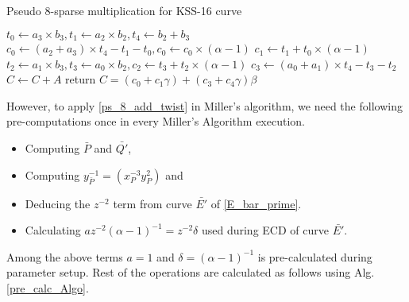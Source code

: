 \vspace{0.6em}
\begin{algorithm}[H]
	\caption{Pseudo 8-sparse multiplication for KSS-16 curve}
	\label{algo_sparse_mul_kss16}
	\DontPrintSemicolon
	\hspace{-3ex}
	\hspace{-3ex}
	\nl $t_0 \leftarrow a_3 \times b_3, t_1 \leftarrow a_2\times b_2,  t_4\leftarrow b_2+b_3$  
	\nl $c_0 \leftarrow (a_2+a_3) \times t_4-t_1-t_0, c_0 \leftarrow c_0 \times (\alpha-1)$ 
	\nl $c_1\leftarrow t_1+ t_0 \times (\alpha-1)$\;
	\nl $t_2\leftarrow a_1\times b_3 ,t_3\leftarrow a_0\times b_2, c_2\leftarrow t_3+t_2 \times (\alpha-1)$ 
	\nl $ c_3 \leftarrow (a_0+a_1)\times t_4-t_3 - t_2 $  
	\nl $C \leftarrow C+A$\;
	\nl return $C=(c_0+c_1\gamma)+(c_3+c_4\gamma)\beta$  
\end{algorithm}
\vspace{0.8mm}
However, to apply \eqref{ps_8_add_twist} in Miller's algorithm, we need the following pre-computations once in every Miller's Algorithm execution.
\begin{itemize}
	\item Computing $\bar{P}$ and $\bar{Q'}$,
	\item Computing $y_{\bar{P}}^{-1}=(x_{P}^{-3} y_{P}^{2})$ and
	\item Deducing the $z^{-2}$ term from curve $\bar{E'}$ of \eqref{E_bar_prime}.
	\item Calculating $az^{-2}(\alpha-1)^{-1} = z^{-2}\delta$ used during ECD of curve $\bar{E'}$.
\end{itemize}
Among the above terms $a=1$ and $\delta=(\alpha-1)^{-1}$ is pre-calculated during parameter setup. Rest of the operations are calculated as follows using Alg. \ref{pre_calc_Algo}.

